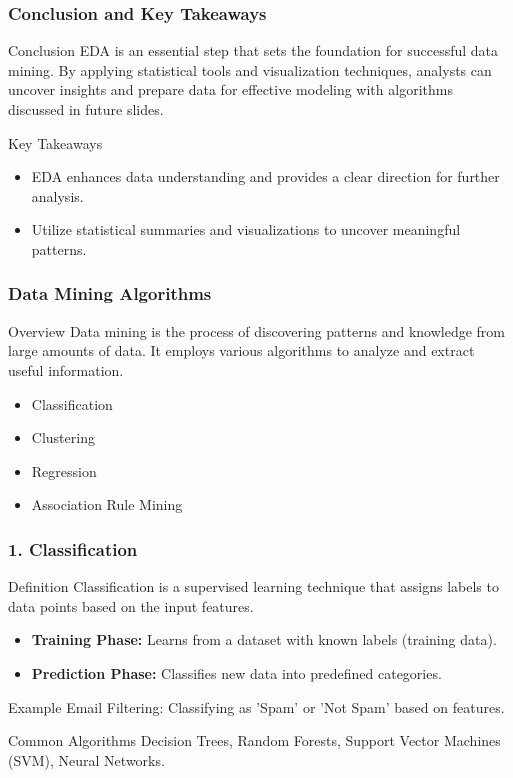 \documentclass{beamer}
\begin{document}
\begin{frame}
    \frametitle{Conclusion and Key Takeaways}
    \begin{block}{Conclusion}
        EDA is an essential step that sets the foundation for successful data mining. By applying statistical tools and visualization techniques, analysts can uncover insights and prepare data for effective modeling with algorithms discussed in future slides.
    \end{block}
    \begin{block}{Key Takeaways}
        \begin{itemize}
            \item EDA enhances data understanding and provides a clear direction for further analysis.
            \item Utilize statistical summaries and visualizations to uncover meaningful patterns.
        \end{itemize}
    \end{block}
\end{frame}

\begin{frame}[fragile]
    \frametitle{Data Mining Algorithms}
    \begin{block}{Overview}
        Data mining is the process of discovering patterns and knowledge from large amounts of data. It employs various algorithms to analyze and extract useful information.
    \end{block}
    \begin{itemize}
        \item Classification
        \item Clustering
        \item Regression
        \item Association Rule Mining
    \end{itemize}
\end{frame}

\begin{frame}[fragile]
    \frametitle{1. Classification}
    \begin{block}{Definition}
        Classification is a supervised learning technique that assigns labels to data points based on the input features.
    \end{block}
    \begin{itemize}
        \item \textbf{Training Phase:} Learns from a dataset with known labels (training data).
        \item \textbf{Prediction Phase:} Classifies new data into predefined categories.
    \end{itemize}
    \begin{block}{Example}
        Email Filtering: Classifying as 'Spam' or 'Not Spam' based on features.
    \end{block}
    \begin{block}{Common Algorithms}
        Decision Trees, Random Forests, Support Vector Machines (SVM), Neural Networks.
    \end{block}
\end{frame}
\end{document}
